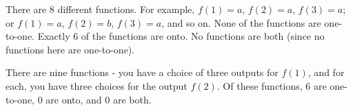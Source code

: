 \documentclass[11pt]{exam}
\begin{document}
\begin{questions}
\question There are 8 different functions.  For example, $f(1) = a$, $f(2) = a$, $f(3) = a$; or $f(1) = a$, $f(2) = b$, $f(3) = a$, and so on.  None of the functions are one-to-one.  Exactly 6 of the functions are onto.  No functions are both (since no functions here are one-to-one).


\question There are nine functions - you have a choice of three outputs for $f(1)$, and for each, you have three choices for the output $f(2)$.  Of these functions, 6 are one-to-one, 0 are onto, and 0 are both.



\question
{}


\question 


\end{questions}
\end{document}
